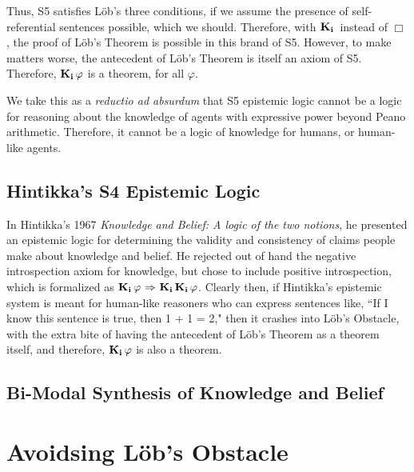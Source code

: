 Thus, S5 satisfies L\"ob's three conditions, if we assume the presence of self-referential sentences possible, which we should. Therefore, with $\mathbf{K}_{\mathbf{i}}\,$ instead of $\Box$, the proof of L\"ob's Theorem is possible in this brand of S5. However, to make matters worse, the antecedent of L\"ob's Theorem is itself an axiom of S5. Therefore, $\mathbf{K}_{\mathbf{i}}\,\varphi$ is a theorem, for all $\varphi$.

We take this as a \emph{reductio ad absurdum} that S5 epistemic logic cannot be a logic for reasoning about the knowledge of agents with expressive power beyond Peano arithmetic. Therefore, it cannot be a logic of knowledge for humans, or human-like agents.

\subsection{Hintikka's S4 Epistemic Logic}
In Hintikka's 1967 \emph{Knowledge and Belief: A logic of the two notions}, he presented an epistemic logic for determining the validity and consistency of claims people make about knowledge and belief. He rejected out of hand the negative introspection axiom for knowledge, but chose to include positive introspection, which is formalized as $\mathbf{K}_{\mathbf{i}}\,\varphi{\ \Rightarrow \ }\mathbf{K}_{\mathbf{i}}\,\mathbf{K}_{\mathbf{i}}\,\varphi$. Clearly then, if Hintikka's epistemic system is meant for human-like reasoners who can express sentences like, ``If I know this sentence is true, then 1 + 1 = 2," then it crashes into L\"ob's Obstacle, with the extra bite of having the antecedent of L\"ob's Theorem as a theorem itself, and therefore, $\mathbf{K}_{\mathbf{i}}\,\varphi$ is also a theorem.

\subsection{Bi-Modal Synthesis of Knowledge and Belief}

\section{Avoidsing L\"ob's Obstacle}
\label{sec:avoid_lob}

